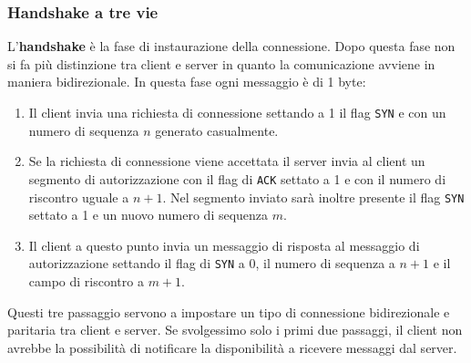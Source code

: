 \subsubsection{Handshake a tre vie}
L'\textbf{handshake} è la fase di instaurazione della connessione. Dopo
questa fase non si fa più distinzione tra client e server in quanto la 
comunicazione avviene in maniera bidirezionale. In questa fase ogni 
messaggio è di 1 byte:
\begin{enumerate}
	\item Il client invia una richiesta di connessione settando a 1 il 
		flag \verb|SYN| e con un numero di sequenza $n$ generato 
		casualmente.
	\item Se la richiesta di connessione viene accettata il server 
		invia al client un segmento di autorizzazione con il flag di 
		\verb|ACK| settato a 1 e con il numero di riscontro uguale a 
		$n+1$. Nel segmento inviato sarà inoltre presente il flag 
		\verb|SYN| settato a 1 e un nuovo numero di sequenza $m$.
	\item Il client a questo punto invia un messaggio di risposta al 
		messaggio di autorizzazione settando il flag di \verb|SYN| a 0,
		il numero di sequenza a $n+1$ e il campo di riscontro a $m+1$.
\end{enumerate}
Questi tre passaggio servono a impostare un tipo di connessione 
bidirezionale e paritaria tra client e server. Se svolgessimo solo i 
primi due passaggi, il client non avrebbe la possibilità di notificare 
la disponibilità a ricevere messaggi dal server.

